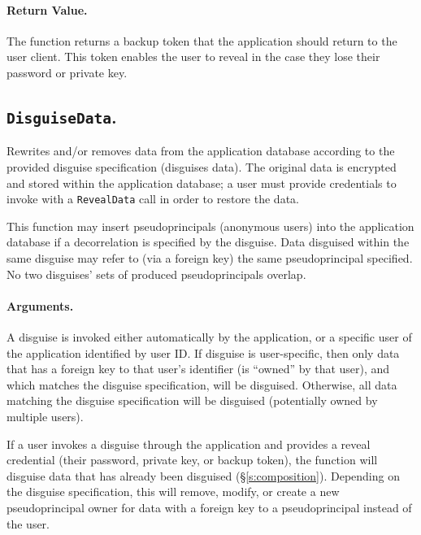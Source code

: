     \paragraph{Return Value.} 
    The function returns a backup token that the application should return to
    the user client. This token enables the user to reveal in the case they lose
    their password or private key.


\subsection{\texttt{DisguiseData}.}

    Rewrites and/or removes data from the application database according to the
    provided disguise specification (\ie disguises data). The original data is encrypted
    and stored within the application database; a user must provide credentials
    to invoke with a \texttt{RevealData} call in order to restore the data.
    
    This function may insert pseudoprincipals (anonymous users) into the
    application database if a decorrelation is specified by the disguise.
     Data disguised within the
    same disguise may refer to (via a foreign key) the same pseudoprincipal
    specified.
    No two disguises' sets of produced pseudoprincipals overlap. 

    \paragraph{Arguments.} 
    A disguise is invoked either automatically by the application, or a specific
    user of the application identified by user ID. 
    If disguise is user-specific, then only data that has a foreign key to that
    user's identifier (is ``owned'' by that user), and which matches the
    disguise specification, will be disguised.  Otherwise, all data matching the
    disguise specification will be disguised (potentially owned by multiple
    users). 

    If a user invokes a disguise through the application and provides a reveal
    credential (their password, private key, or backup token), the function will
    disguise data that has already been disguised (\S\ref{s:composition}).
    Depending on the disguise specification, this will remove, modify, or create
    a new pseudoprincipal owner for data with a foreign key to a pseudoprincipal
    instead of the user.

